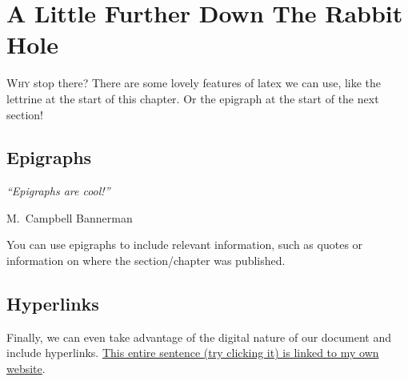 \documentclass[12pt,MEng]{UoAThesis}
\begin{document}
\chapter{A Little Further Down The Rabbit Hole}
\lettrine{W}{hy} stop there? There are some lovely features of latex
we can use, like the lettrine at the start of this chapter. Or the
epigraph at the start of the next section!
\section{Epigraphs}
\epigraph{{\em ``Epigraphs are cool!''}}{M.~Campbell Bannerman}

You can use epigraphs to include relevant information, such as quotes
or information on where the section/chapter was published.

\section{Hyperlinks}
Finally, we can even take advantage of the digital nature of our
document and include
hyperlinks. \href{https://marcusbannerman.co.uk/images/stories/pdfs/thesis.pdf}{
  This entire sentence (try clicking it) is linked to my own website}.

\printbibliography[heading=thesisChapterBib]
\end{document}
